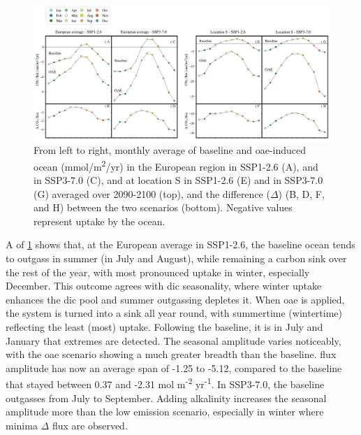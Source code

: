 \begin{figure}[H]
\caption[Monthly average of baseline and \texorpdfstring{OAE}{OAE}-induced ocean  flux]{From left to right, monthly average of baseline and \ac{oae}-induced ocean  (mmol/m\textsuperscript{2}/yr) in the European region in SSP1-2.6 (A), and in SSP3-7.0 (C), and at location S in SSP1-2.6 (E) and in SSP3-7.0 (G) averaged over 2090-2100 (top), and the difference ($\Delta$) (B, D, F, and H) between the two scenarios (bottom). Negative values represent  uptake by the ocean.}
\label{co2flux}
\centering
\includegraphics[width=15cm]{fig/3_Results/CO2flux/co2flux.png}

\end{figure}

A of \cref{co2flux} shows that, at the European average in SSP1-2.6, the baseline ocean tends to outgass  in summer (in July and August), while remaining a carbon sink over the rest of the year, with most pronounced uptake in winter, especially December. This outcome agrees with \ac{dic} seasonality, where winter uptake enhances the \ac{dic} pool and summer outgassing depletes it. When \ac{oae} is applied, the system is turned into a sink all year round, with summertime (wintertime) reflecting the least (most)  uptake. Following the baseline, it is in July and January that extremes are detected. The seasonal amplitude varies noticeably, with the \ac{oae} scenario showing a much greater breadth than the baseline.  flux amplitude has now an average span of -1.25 to -5.12, compared to the baseline that stayed between 0.37 and -2.31 mol m\textsuperscript{-2} yr\textsuperscript{-1}. In SSP3-7.0, the baseline outgasses  from July to September. Adding alkalinity increases the  seasonal amplitude more than the low emission scenario, especially in winter where minima $\Delta$  flux are observed. 

